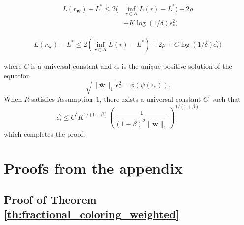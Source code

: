 \documentclass[letterpaper]{article} %
\def\DoubleColumnEnd{}
\def\SingleColumn{}
\def\SingleColumnEnd{}
\newcommand{\weight}{\mathbf{w}}
\newcommand{\verticeweight}{\bar{\mathbf{w}}}
\newcommand{\bayeserror}{L^*}
\newcommand{\risk}{L}
\newcommand{\normo}[1]{\|#1\|_1}
\newcommand{\complexbound}{\beta}
\begin{document}
    \begin{equation}
        \begin{aligned}
            \label{eq:main_result_proof_1}
            \risk(r_\weight{})-\bayeserror \le 2(&\inf_{r\in R}\risk(r)-\bayeserror) + 2\rho \\
            &+ K\log(1/\delta)\epsilon_*^2)
        \end{aligned}
    \end{equation}
    \DoubleColumnEnd
    \SingleColumn
    \begin{equation}
        \begin{aligned}
            \label{eq:main_result_proof_1}
            \risk(r_\weight{})-\bayeserror \le 2(\inf_{r\in R}\risk(r)-\bayeserror) + 2\rho + C\log(1/\delta)\epsilon_*^2)
        \end{aligned}
    \end{equation}
    \SingleColumnEnd
    where $C$ is a universal constant and $\epsilon_*$ is the unique positive solution of the equation
    \[\sqrt{\normo{\verticeweight{}}}\epsilon_*^2=\phi(\psi(\epsilon_*)).\]
    When $ R$ satisfies Assumption~$1$, there exists a universal constant $C^\prime$ such that
    \[\epsilon_*^2\le C^\prime K^{1/(1+\complexbound{})}(\frac{1}{(1-\complexbound{})^2\normo{\verticeweight{}}})^{1/(1+\complexbound{})}\]
    which completes the proof.


\section{Proofs from the appendix} %
\label{sec:proofs_of_the_appendix}

\subsection{Proof of Theorem \ref{th:fractional_coloring_weighted}} %
\label{sub:proof_of_theorem_th:fractional_coloring_weighted}
\end{document}
